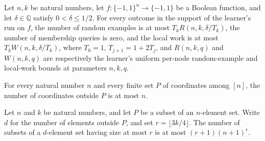 \begin{theorem}
\label{FABL.lowDegreeJuntaLearnerProgram_cost_le}
\leanok
{}
Let $n,k$ be natural numbers, let $f:\{−1,1\}^n\to\{−1,1\}$ be a Boolean function, and
let $\delta\in\mathbb{Q}$ satisfy $0<\delta\le 1/2$. For every outcome in the support of
the learner's run on $f$, the number of random examples is at most $T_k
R(n,k,\delta/T_k)$, the number of membership queries is zero, and the local work is at
most $T_k W(n,k,\delta/T_k)$, where $T_0=1$, $T_{j+1}=1+2T_j$, and $R(n,k,q)$ and
$W(n,k,q)$ are respectively the learner's uniform per-node random-example and local-work
bounds at parameters $n,k,q$.
\end{theorem}

\begin{theorem}
\label{FABL.juntaRestrictionDimension_le}
\leanok
{}
For every natural number $n$ and every finite set $P$ of coordinates among $[n]$, the
number of coordinates outside $P$ is at most $n$.
\end{theorem}

\begin{theorem}
\label{FABL.card_lowDegreeJuntaFourierFamily_le}
\leanok
{}
Let $n$ and $k$ be natural numbers, and let $P$ be a subset of an $n$-element set. Write
$d$ for the number of elements outside $P$, and set $r=\lfloor 3k/4\rfloor$. The number
of subsets of a $d$-element set having size at most $r$ is at most $(r+1)(n+1)^r$.
\end{theorem}

